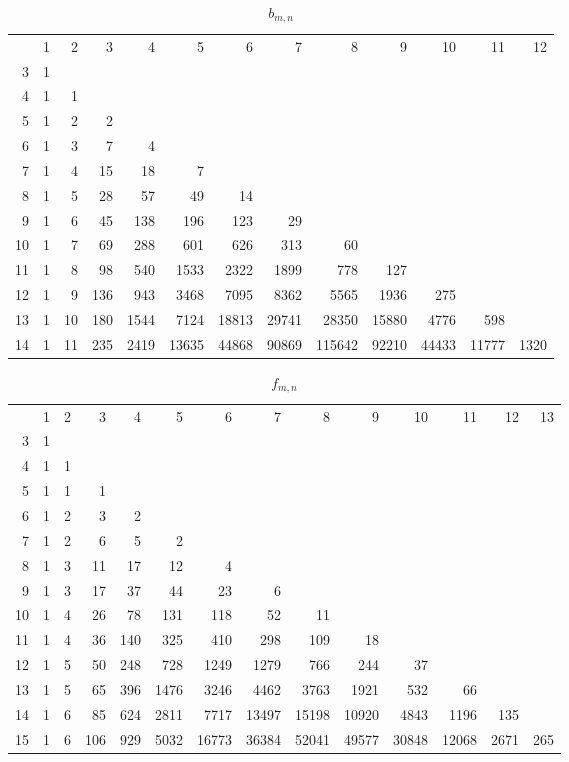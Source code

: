 \documentclass[10pt]{amsart}
\begin{document}
\begin{table}[h]
{\scriptsize \begin{tabular}{|r|rrrrrrrrrrrr|} \hline
& 1 & 2 & 3 & 4 & 5 & 6 & 7 & 8 & 9 & 10 & 11 & 12 \\
3 & 1 &&&&&&&&&&& \\
4 & 1 & 1 &&&&&&&&&& \\
5 & 1 & 2 & 2 &&&&&&&&& \\
6 & 1 & 3 & 7 & 4 &&&&&&&& \\
7 & 1 & 4 & 15 & 18 & 7 &&&&&&& \\
8 & 1 & 5 & 28 & 57 & 49 & 14 &&&&&& \\
9 & 1 & 6 & 45 & 138 & 196 & 123 & 29 &&&&& \\
10 & 1 & 7 & 69 & 288 & 601 & 626 & 313 & 60 &&&& \\
11 & 1 & 8 & 98 & 540 & 1533 & 2322 & 1899 & 778 & 127 &&& \\
12 & 1 & 9 & 136 & 943 & 3468 & 7095 & 8362 & 5565 & 1936 & 275 && \\
13 & 1 & 10 & 180 & 1544 & 7124 & 18813 & 29741 & 28350 & 15880 & 4776 & 598 & \\
14 & 1 & 11 & 235 & 2419 & 13635 & 44868 & 90869 & 115642 & 92210 & 44433 & 11777 & 1320 \\ \hline
\end{tabular}}
\vspace{.2cm}
\caption{$b_{m,n}$}
\label{b-mn}
\end{table}

\begin{table}[h]
{\scriptsize \begin{tabular}{|r|rrrrrrrrrrrrr|} \hline
& 1 & 2 & 3 & 4 & 5 & 6 & 7 & 8 & 9 & 10 & 11 & 12 & 13 \\
3 & 1 &&&&&&&&&&&& \\
4 & 1 & 1 &&&&&&&&&&& \\
5 & 1 & 1 & 1 &&&&&&&&&& \\
6 & 1 & 2 & 3 & 2 &&&&&&&&& \\
7 & 1 & 2 & 6 & 5 & 2 &&&&&&&& \\
8 & 1 & 3 & 11 & 17 & 12 & 4 &&&&&&& \\
9 & 1 & 3 & 17 & 37 & 44 & 23 & 6 &&&&&& \\
10 & 1 & 4 & 26 & 78 & 131 & 118 & 52 & 11 &&&&& \\
11 & 1 & 4 & 36 & 140 & 325 & 410 & 298 & 109 & 18 &&&& \\
12 & 1 & 5 & 50 & 248 & 728 & 1249 & 1279 & 766  & 244 & 37 &&& \\
13 & 1 & 5 & 65 & 396 & 1476 & 3246 & 4462 & 3763 & 1921 &  532 & 66 && \\
14 & 1 & 6 & 85 & 624 & 2811 &  7717 & 13497 & 15198 & 10920 & 4843 & 1196 & 135 & \\
15 & 1 & 6 & 106 & 929 & 5032 & 16773 & 36384 & 52041 & 49577 & 30848 & 12068 & 2671 & 265 \\
\hline
\end{tabular}}
\vspace{.2cm}
\caption{$f_{m,n}$}
\label{f-mn}
\end{table}
\end{document}
